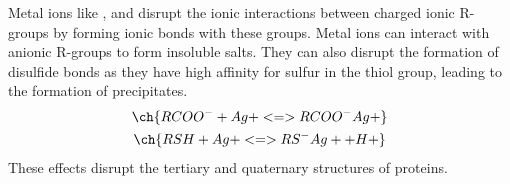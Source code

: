 \documentclass[Chemistry.tex]{subfiles}
\begin{document}
Metal ions like ,  and  disrupt the ionic interactions between charged ionic R-groups by forming ionic bonds with these groups. Metal ions can interact with anionic R-groups to form insoluble salts. They can also disrupt the formation of disulfide bonds as they have high affinity for sulfur in the thiol group, leading to the formation of precipitates. \begin{gather}\ch{RCOO^- + Ag+ <=> RCOO^-Ag+}\\\ch{RSH + Ag+ <=> RS^-Ag+ + H+}\end{gather} These effects disrupt the tertiary and quaternary structures of proteins.
\end{document}
